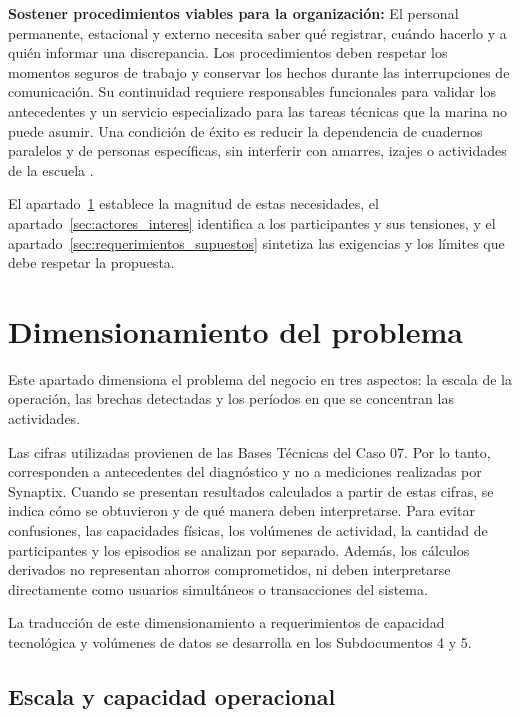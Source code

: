 \textbf{Sostener procedimientos viables para la organización:}
El personal permanente, estacional y externo necesita saber qué registrar, cuándo hacerlo y a quién informar una discrepancia. Los procedimientos deben respetar los momentos seguros de trabajo y conservar los hechos durante las interrupciones de comunicación. Su continuidad requiere responsables funcionales para validar los antecedentes y un servicio especializado para las tareas técnicas que la marina no puede asumir. Una condición de éxito es reducir la dependencia de cuadernos paralelos y de personas específicas, sin interferir con amarres, izajes o actividades de la escuela \parencite[cap.~2, secc.~2.4, pp.~7-8; cap.~10, p.~26; cap.~15, RT-03.10, p.~33]{pucv-caso07-2026}.

El apartado~\ref{sec:dimensionamiento_problema} establece la magnitud de estas necesidades, el apartado~\ref{sec:actores_interes} identifica a los participantes y sus tensiones, y el apartado~\ref{sec:requerimientos_supuestos} sintetiza las exigencias y los límites que debe respetar la propuesta.

\newpage
\section{Dimensionamiento del problema} %
\label{sec:dimensionamiento_problema}
Este apartado dimensiona el problema del negocio en tres aspectos: la escala de la operación, las brechas detectadas y los períodos en que se concentran las actividades.

Las cifras utilizadas provienen de las Bases Técnicas del Caso 07. Por lo tanto, corresponden a antecedentes del diagnóstico y no a mediciones realizadas por Synaptix. Cuando se presentan resultados calculados a partir de estas cifras, se indica cómo se obtuvieron y de qué manera deben interpretarse. Para evitar confusiones, las capacidades físicas, los volúmenes de actividad, la cantidad de participantes y los episodios se analizan por separado. Además, los cálculos derivados no representan ahorros comprometidos, ni deben interpretarse directamente como usuarios simultáneos o transacciones del sistema.

La traducción de este dimensionamiento a requerimientos de capacidad tecnológica y volúmenes de datos se desarrolla en los Subdocumentos 4 y 5.

\subsection{Escala y capacidad operacional} %

